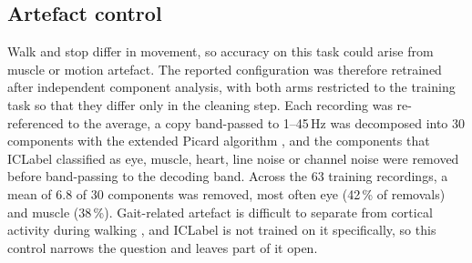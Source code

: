 \documentclass[a4paper,fleqn]{cas-dc}
\begin{document}
\subsection{Artefact control}
\label{sec:artefact}

Walk and stop differ in movement, so accuracy on this task could arise
from muscle or motion artefact. The reported configuration was therefore
retrained after independent component analysis, with both arms
restricted to the training task so that they differ only in the cleaning
step. Each recording was re-referenced to the average, a copy
band-passed to 1--45\,Hz was decomposed into 30 components with the
extended Picard algorithm \citep{picard}, and the components that
ICLabel \citep{iclabel} classified as eye, muscle, heart, line noise or
channel noise were removed before band-passing to the decoding band.
Across the 63 training recordings, a mean of 6.8 of 30 components was
removed, most often eye (42\,\% of removals) and muscle (38\,\%). Gait-related artefact is difficult to separate from cortical
activity during walking \citep{castermans2014,kline2015}, and ICLabel is
not trained on it specifically, so this control narrows the question and
leaves part of it open.

\begin{table}[t]
\caption{Artefact control on cohort~A, for the reported model.
Balanced accuracy of stem $+$ branch on the training task, before and
after ICA cleaning, mean over three seeds. Change is cleaned minus uncleaned,
and Muscle ICs is the mean number of ICLabel muscle components removed per
recording. The last row is the mean $\pm$ SD
across participants.}
\label{tab:artefact}
\centering
{}
\end{table}
\end{document}
